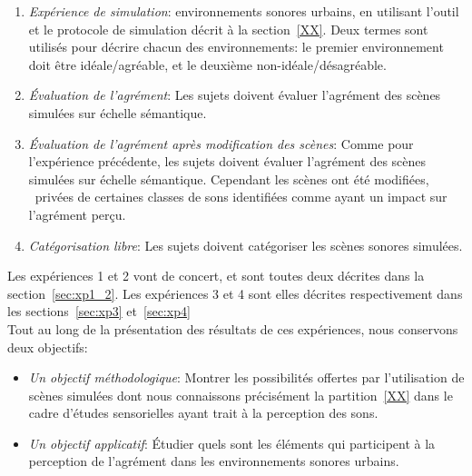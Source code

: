 \begin{enumerate}
\item \emph{Expérience de simulation}:   environnements sonores urbains, en utilisant l'outil et le protocole de simulation décrit à la section~\ref{XX}.  Deux termes sont utilisés pour décrire chacun des environnements: le premier environnement doit être idéale/agréable, et le deuxième non-idéale/désagréable.
\item \emph{Évaluation de l'agrément}: Les sujets doivent évaluer l'agrément des scènes simulées sur échelle sémantique.
\item \emph{Évaluation de l'agrément après modification des scènes}: Comme pour l'expérience précédente, les sujets doivent évaluer l'agrément des scènes simulées sur échelle sémantique. Cependant les scènes ont été modifiées, \ie~privées de certaines classes de sons identifiées comme ayant un impact sur l'agrément perçu. 
\item \emph{Catégorisation libre}: Les sujets doivent catégoriser les scènes sonores simulées.   
\end{enumerate}

Les expériences 1 et 2 vont de concert, et sont toutes deux décrites dans la section~\ref{sec:xp1_2}. Les expériences 3 et 4 sont elles décrites respectivement dans les sections~\ref{sec:xp3} et~\ref{sec:xp4}  \\

Tout au long de la présentation des résultats de ces expériences, nous conservons deux objectifs:

\begin{itemize}
\item \emph{Un objectif méthodologique}: Montrer les possibilités offertes par l'utilisation de scènes simulées  dont nous connaissons précisément la partition~\ref{XX} dans le cadre d'études sensorielles ayant trait à la perception des sons.
\item \emph{Un objectif applicatif}: Étudier quels sont les éléments qui participent à la perception de l'agrément dans les environnements sonores urbains. 
\end{itemize}

